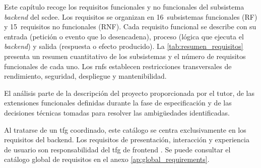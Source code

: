 
Este capítulo recoge los requisitos funcionales y no funcionales del subsistema
\textit{backend} del \ac{scdee}. Los requisitos se organizan en 16~subsistemas
funcionales (RF) y 15~requisitos no funcionales (RNF). Cada requisito funcional se
describe con su entrada (petición o evento que lo desencadena), proceso (lógica
que ejecuta el \textit{backend}) y salida (respuesta o efecto producido). La
\cref{tab:resumen_requisitos} presenta un resumen cuantitativo de los
subsistemas y el número de requisitos funcionales de cada uno. Los \acsp{rnf}
establecen restricciones transversales de rendimiento, seguridad, despliegue y
mantenibilidad.

El análisis parte de la descripción del proyecto proporcionada por el tutor, de las
extensiones funcionales definidas durante la fase de especificación y de las decisiones
técnicas tomadas para resolver las ambigüedades identificadas.

Al tratarse de un \ac{tfg} coordinado, este catálogo se centra exclusivamente en los
requisitos del backend. Los requisitos de presentación, interacción y experiencia de
usuario son responsabilidad del \ac{tfg} de frontend \cite{soler2026frontend}. Se puede
consultar el catálogo global de requisitos en el anexo \ref{ap:global_requirements}.
